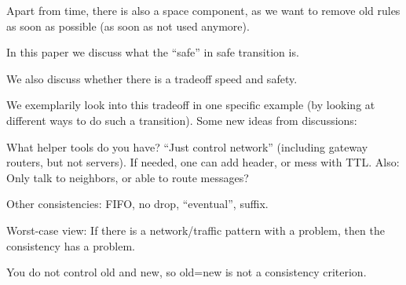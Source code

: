 Apart from time, there is also a space component, as we want to remove old rules as soon as possible (as soon as not used anymore).

In this paper we discuss what the ``safe'' in safe transition is.

We also discuss whether there is a tradeoff speed and safety.

We exemplarily look into this tradeoff in one specific example (by looking at different ways to do such a transition).
Some new ideas from discussions:

What helper tools do you have? ``Just control network'' (including gateway routers, but not servers). If needed, one can add header, or mess with TTL. Also: Only talk to neighbors, or able to route messages?

Other consistencies: FIFO, no drop, ``eventual'', suffix.

Worst-case view: If there is a network/traffic pattern with a problem, then the consistency has a problem.

You do not control old and new, so old=new is not a consistency criterion.


